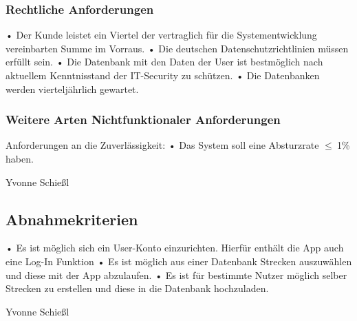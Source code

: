 \documentclass[a4paper, 12pt]{article}
\begin{document}
\subsubsection{Rechtliche Anforderungen}
• Der Kunde leistet ein Viertel der vertraglich für die Systementwicklung vereinbarten Summe im Vorraus.\newline
\label{Datenschutz}
• Die deutschen Datenschutzrichtlinien müssen erfüllt sein.\newline
\label{Sicherheit}
• Die Datenbank mit den Daten der User ist bestmöglich nach aktuellem Kenntnisstand der IT-Security zu schützen.\newline
• Die Datenbanken werden vierteljährlich gewartet.
\subsubsection{Weitere Arten Nichtfunktionaler Anforderungen}
\label{Bugs}
Anforderungen an die Zuverlässigkeit:\newline
• Das System soll eine Absturzrate  $\leq \ $1\% haben. %

Yvonne Schießl

\subsection{Abnahmekriterien}
• Es ist möglich sich ein User-Konto einzurichten. Hierfür enthält die App auch eine Log-In Funktion\newline
• Es ist möglich aus einer Datenbank Strecken auszuwählen und diese mit der App abzulaufen.\newline
• Es ist für bestimmte Nutzer möglich selber Strecken zu erstellen und diese in die Datenbank hochzuladen.

Yvonne Schießl
\end{document}
